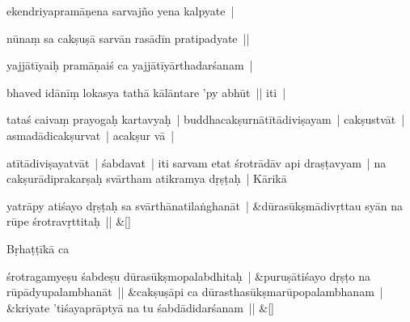 \documentclass[article,12pt,a4paper]{memoir}%
\newcommand{\name}[1]{#1}
\newcounter{parCount}
\begin{document}
	  
	  \pstart \leavevmode%
	ekendriyapramāṇena sarvajño yena kalpyate | 
	{}
	\pend%
      

	  
	  \pstart \leavevmode%
	nūnaṃ sa cakṣuṣā sarvān rasādīn pratipadyate || 
	{}
	\pend%
      

	  
	  \pstart \leavevmode%
	yajjātīyaiḥ pramāṇaiś ca yajjātīyārthadarśanam | 
	{}
	\pend%
      

	  
	  \pstart \leavevmode%
	bhaved idānīṃ lokasya tathā kālāntare 'py abhūt || iti | 
	{}
	\pend%
      

	  
	  \pstart \leavevmode%
	tataś caivaṃ prayogaḥ kartavyaḥ | buddhacakṣurnātītādiviṣayam | cakṣustvāt | asmadādicakṣurvat | acakṣur vā | 
	{}
	\pend%
      

	  
	  \pstart \leavevmode%
	atītādiviṣayatvāt | śabdavat | iti sarvam etat śrotrādāv api draṣṭavyam | na cakṣurādiprakarṣaḥ svārtham atikramya dṛṣṭaḥ | \name{Kārikā}
	{}
	\pend%
      
	    
	    \stanza[\smallbreak]
	  yatrāpy atiśayo dṛṣṭaḥ sa svārthānatilaṅghanāt | &dūrasūkṣmādivṛttau syān na rūpe śrotravṛttitaḥ || \&[\smallbreak]
	  
	  
	  

	  
	  \pstart \leavevmode%
	\name{Bṛhaṭṭīkā} ca
	{}
	\pend%
      
	    
	    \stanza[\smallbreak]
	  śrotragamyeṣu śabdeṣu dūrasūkṣmopalabdhitaḥ | &puruṣātiśayo dṛṣṭo na rūpādyupalambhanāt || &cakṣuṣāpi ca dūrasthasūkṣmarūpopalambhanam | &kriyate 'tiśayaprāptyā na tu śabdādidarśanam || \&[\smallbreak]
	  
\end{document}
